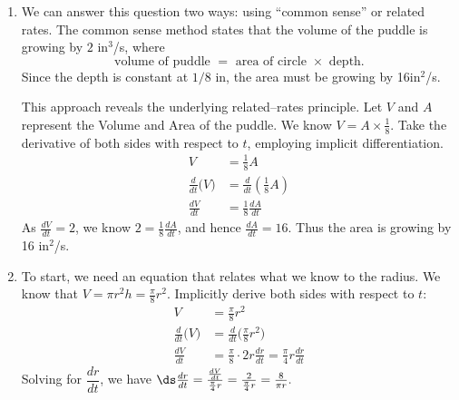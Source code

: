 {\begin{enumerate}
\item We can answer this question two ways: using ``common sense'' or related rates. The common sense method states that the volume of the puddle is growing by $2$ in$^3$/s, where
\[\text{volume of puddle } = \text{ area of circle } \times \text{ depth.}\]
Since the depth is constant at $1/8$ in, the area must be growing by 16in$^2$/s.

This approach reveals the underlying related--rates principle. Let $V$ and $A$ represent the Volume and Area of the puddle. We know $V= A\times \frac18$. Take the derivative of both sides with respect to $t$, employing implicit differentiation.
\begin{align*}
V &= \frac18A\\
\frac{d}{dt}\big(V\big) &= \frac{d}{dt}\left(\frac18A\right)\\
\frac{dV}{dt} &=	\frac18\frac{dA}{dt}
\end{align*} 
As $\frac{dV}{dt} = 2$, we know $2 = \frac18\frac{dA}{dt}$, and hence $\frac{dA}{dt} = 16$. Thus the area is growing by 16 in$^2$/s.

\item		To start, we need an equation that relates what we know to the radius.
We know that $V=\pi r^2h=\frac\pi8r^2$.  Implicitly derive both sides with respect to $t$:
\begin{align*}
 V &= \frac\pi8 r^2 \\
 \frac{d}{dt}\big(V\big) &= \frac{d}{dt}\big(\frac\pi8 r^2\big) \\
 \frac{dV}{dt} &= \frac\pi8\cdot2r\frac{dr}{dt}=\frac\pi4 r\frac{dr}{dt}
\end{align*}
Solving for $\dfrac{dr}{dt}$, we have
$\ds
\frac{dr}{dt}=\frac{\frac{dV}{dt}}{\frac\pi4 r}
=\frac{2}{\frac\pi4 r}=\frac8{\pi r}.
$
%
%


\end{enumerate}}
